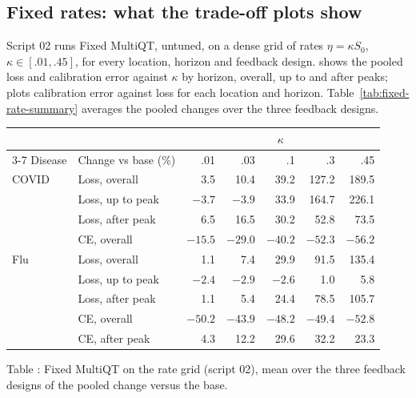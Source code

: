 \documentclass[11pt,a4paper]{article}
\theoremstyle{definition}
\theoremstyle{remark}
\begin{document}
\subsection{Fixed rates: what the trade-off plots show}
\label{sec:results-fixed-rates}
Script 02 runs Fixed MultiQT, untuned, on a dense grid of rates
$\eta=\kappa S_0$, $\kappa\in[.01,.45]$, for every location, horizon and
feedback design.  shows the pooled
loss and calibration error against $\kappa$ by horizon, overall, up to
and after peaks;  plots calibration
error against loss for each location and horizon.
Table~\ref{tab:fixed-rate-summary} averages the pooled changes over the
three feedback designs.

\begin{center}\small
\renewcommand{\arraystretch}{1.15}
\begin{tabular}{@{}llrrrrr@{}}
\toprule
 & & \multicolumn{5}{c}{$\kappa$}\\
\cmidrule(l){3-7}
Disease & Change vs base (\%) & .01 & .03 & .1 & .3 & .45\\
\midrule
COVID & Loss, overall      & 3.5  & 10.4 & 39.2 & 127.2 & 189.5\\
      & Loss, up to peak   & $-3.7$ & $-3.9$ & 33.9 & 164.7 & 226.1\\
      & Loss, after peak   & 6.5  & 16.5 & 30.2 & 52.8  & 73.5\\
      & CE, overall        & $-15.5$ & $-29.0$ & $-40.2$ & $-52.3$ & $-56.2$\\
\addlinespace
Flu   & Loss, overall      & 1.1  & 7.4  & 29.9 & 91.5  & 135.4\\
      & Loss, up to peak   & $-2.4$ & $-2.9$ & $-2.6$ & 1.0 & 5.8\\
      & Loss, after peak   & 1.1  & 5.4  & 24.4 & 78.5  & 105.7\\
      & CE, overall        & $-50.2$ & $-43.9$ & $-48.2$ & $-49.4$ & $-52.8$\\
      & CE, after peak     & 4.3 & 12.2 & 29.6 & 32.2 & 23.3\\
\bottomrule
\end{tabular}
\end{center}
\label{tab:fixed-rate-summary}
\begin{center}\small Table \thetable: Fixed MultiQT on the rate grid (script 02),
mean over the three feedback designs of the pooled change versus the base.
\end{center}
\end{document}
